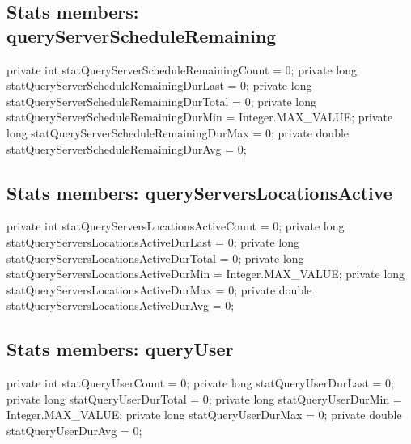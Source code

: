 \subsection{Stats members: queryServerScheduleRemaining}
\nwenddocs{}\endmoddef{}
private int    statQueryServerScheduleRemainingCount    = 0;
private long   statQueryServerScheduleRemainingDurLast  = 0;
private long   statQueryServerScheduleRemainingDurTotal = 0;
private long   statQueryServerScheduleRemainingDurMin   = Integer.MAX_VALUE;
private long   statQueryServerScheduleRemainingDurMax   = 0;
private double statQueryServerScheduleRemainingDurAvg   = 0;
\nwendcode{}\nwdocspar

\subsection{Stats members: queryServersLocationsActive}
\nwenddocs{}\endmoddef{}
private int    statQueryServersLocationsActiveCount    = 0;
private long   statQueryServersLocationsActiveDurLast  = 0;
private long   statQueryServersLocationsActiveDurTotal = 0;
private long   statQueryServersLocationsActiveDurMin   = Integer.MAX_VALUE;
private long   statQueryServersLocationsActiveDurMax   = 0;
private double statQueryServersLocationsActiveDurAvg   = 0;
\nwendcode{}\nwdocspar

\subsection{Stats members: queryUser}
\nwenddocs{}\endmoddef{}
private int    statQueryUserCount    = 0;
private long   statQueryUserDurLast  = 0;
private long   statQueryUserDurTotal = 0;
private long   statQueryUserDurMin   = Integer.MAX_VALUE;
private long   statQueryUserDurMax   = 0;
private double statQueryUserDurAvg   = 0;
\nwendcode{}\nwdocspar

